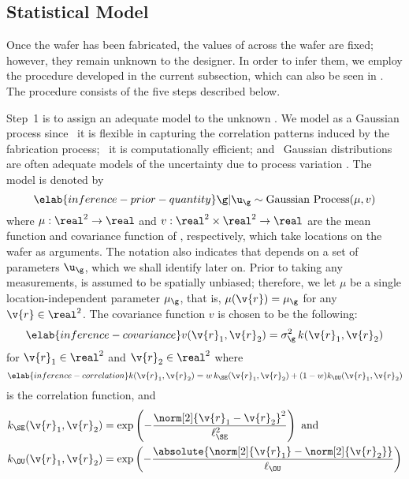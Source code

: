 \subsection{Statistical Model}

Once the wafer has been fabricated, the values of \g across the wafer are fixed;
however, they remain unknown to the designer. In order to infer them, we employ
the procedure developed in the current subsection, which can also be seen in
. The procedure consists of the five steps
described below.

Step~1 is to assign an adequate model to the unknown \g. We model \g as a
Gaussian process \cite{rasmussen2006} since \one~it is flexible in capturing the
correlation patterns induced by the fabrication process; \two~it is
computationally efficient; and \three~Gaussian distributions are often adequate
models of the uncertainty due to process variation \cite{reda2009,
srivastava2010, juan2012}. The model is denoted by
\begin{equation} \elab{inference-prior-quantity}
  \g | \u_\g \sim \mathrm{Gaussian\ Process}(\mu, v)
\end{equation}
where $\mu: \real^2 \to \real$ and $v: \real^2 \times \real^2 \to \real$ are the
mean function and covariance function of \g, respectively, which take locations
on the wafer as arguments. The notation also indicates that \g depends on a set
of parameters $\u_\g$, which we shall identify later on. Prior to taking any
measurements, \g is assumed to be spatially unbiased; therefore, we let $\mu$ be
a single location-independent parameter $\mu_\g$, that is, $\mu(\v{r}) = \mu_\g$
for any $\v{r} \in \real^2$. The covariance function $v$ is chosen to be the
following:
\begin{equation} \elab{inference-covariance}
  v(\v{r}_1, \v{r}_2) = \sigma_\g^2 \, k(\v{r}_1, \v{r}_2)
\end{equation}
for $\v{r}_1 \in \real^2$ and $\v{r}_2 \in \real^2$ where
\begin{equation} \elab{inference-correlation}
  k(\v{r}_1, \v{r}_2) = w \, k_\SE(\v{r}_1, \v{r}_2) + (1 - w) k_\OU(\v{r}_1, \v{r}_2)
\end{equation}
is the correlation function, and
\begin{align*}
  k_\SE(\v{r}_1, \v{r}_2) & = \exp\left(-\frac{\norm[2]{\v{r}_1 - \v{r}_2}^2}{\ell_\SE^2}\right) \text{ and} \\
  k_\OU(\v{r}_1, \v{r}_2) & = \exp\left(-\frac{\absolute{\norm[2]{\v{r}_1} - \norm[2]{\v{r}_2}}}{\ell_\OU}\right)
\end{align*}
